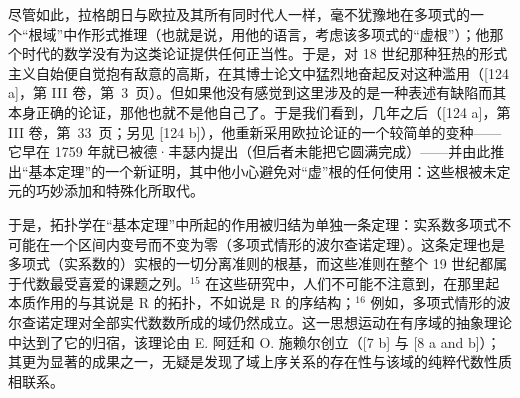 尽管如此，拉格朗日与欧拉及其所有同时代人一样，毫不犹豫地在多项式的一个“根域”中作形式推理（也就是说，用他的语言，考虑该多项式的“虚根”）；他那个时代的数学没有为这类论证提供任何正当性。于是，对 18 世纪那种狂热的形式主义自始便自觉抱有敌意的高斯，在其博士论文中猛烈地奋起反对这种滥用（{[}124 a{]}，第 III 卷，第~3~页）。但如果他没有感觉到这里涉及的是一种表述有缺陷而其本身正确的论证，那他也就不是他自己了。于是我们看到，几年之后（{[}124 a{]}，第 III 卷，第~33~页；另见 {[}124 b{]}），他重新采用欧拉论证的一个较简单的变种——它早在 1759 年就已被德·丰瑟内提出（但后者未能把它圆满完成）——并由此推出“基本定理”的一个新证明，其中他小心避免对“虚”根的任何使用：这些根被未定元的巧妙添加和特殊化所取代。

于是，拓扑学在“基本定理”中所起的作用被归结为单独一条定理：实系数多项式不可能在一个区间内变号而不变为零（多项式情形的波尔查诺定理）。这条定理也是多项式（实系数的）实根的一切分离准则的根基，而这些准则在整个 19 世纪都属于代数最受喜爱的课题之列。\(^{15}\) 在这些研究中，人们不可能不注意到，在那里起本质作用的与其说是 R 的拓扑，不如说是 R 的序结构；\(^{16}\) 例如，多项式情形的波尔查诺定理对全部实代数数所成的域仍然成立。这一思想运动在有序域的抽象理论中达到了它的归宿，该理论由 E. 阿廷和 O. 施赖尔创立（{[}7 b{]} 与 {[}8 a and b{]}）；其更为显著的成果之一，无疑是发现了域上序关系的存在性与该域的纯粹代数性质相联系。
